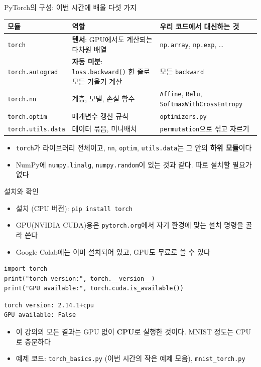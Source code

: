 \documentclass[aspectratio=169,11pt]{beamer}
\newcommand{\code}[1]{\texttt{#1}}
\begin{document}
\begin{frame}{PyTorch의 구성: 이번 시간에 배울 다섯 가지}
\centering
\small
\renewcommand{\arraystretch}{1.3}
\begin{tabular}{>{\raggedright}p{3.0cm}>{\raggedright}p{5.4cm}>{\raggedright\arraybackslash}p{4.4cm}}
\toprule
\textbf{모듈} & \textbf{역할} & \textbf{우리 코드에서 대신하는 것} \\
\midrule
\code{torch} & \textbf{텐서}: GPU에서도 계산되는 다차원 배열 & \code{np.array}, \code{np.exp}, \ldots \\
\code{torch.autograd} & \textbf{자동 미분}: \code{loss.backward()} 한 줄로 모든 기울기 계산 & 모든 \code{backward} \\
\code{torch.nn} & 계층, 모델, 손실 함수 & \code{Affine}, \code{Relu}, \code{SoftmaxWithCrossEntropy} \\
\code{torch.optim} & 매개변수 갱신 규칙 & \code{optimizers.py} \\
\code{torch.utils.data} & 데이터 묶음, 미니배치 & \code{permutation}으로 섞고 자르기 \\
\bottomrule
\end{tabular}
\vskip3mm
\raggedright
\begin{itemize}
\item \code{torch}가 라이브러리 전체이고, \code{nn}, \code{optim}, \code{utils.data}는 그 안의 \textbf{하위 모듈}이다
\item NumPy에 \code{numpy.linalg}, \code{numpy.random}이 있는 것과 같다. 따로 설치할 필요가 없다
\end{itemize}
\end{frame}

\begin{frame}[fragile]{설치와 확인}
\begin{itemize}
\item 설치 (CPU 버전): \code{pip install torch}
\item GPU(NVIDIA CUDA)용은 \code{pytorch.org}에서 자기 환경에 맞는 설치 명령을 골라 쓴다
\item Google Colab에는 이미 설치되어 있고, GPU도 무료로 쓸 수 있다
\end{itemize}
\begin{lstlisting}
import torch
print("torch version:", torch.__version__)
print("GPU available:", torch.cuda.is_available())
\end{lstlisting}
\begin{lstlisting}[style=outstyle]
torch version: 2.14.1+cpu
GPU available: False
\end{lstlisting}
\begin{itemize}
\item 이 강의의 모든 결과는 GPU 없이 \textbf{CPU}로 실행한 것이다. MNIST 정도는 CPU로 충분하다
\item 예제 코드: \code{torch\_basics.py} (이번 시간의 작은 예제 모음), \code{mnist\_torch.py}
\end{itemize}
\end{frame}
\end{document}
